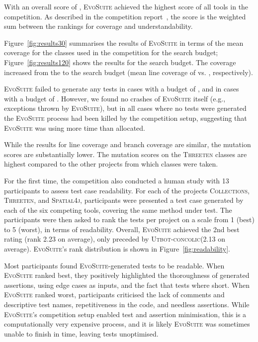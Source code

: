\documentclass[10pt,conference]{IEEEtran}
\newcommand{\project}[1]{\textsc{#1}\xspace}
\newcommand{\Collections}{\project{Collections}}
\newcommand{\Threeten}{\project{Threeten}}
\newcommand{\Spatial}{\project{Spatial4j}}
\newcommand{\EVOSUITE}{\textsc{EvoSuite}\xspace}
\newcommand{\UtbotConcolic}{\textsc{Utbot-concolic}\xspace}
\begin{document}
With an overall score of \score, \EVOSUITE achieved the highest score of all
tools in the competition. As described in the competition
report~\cite{SBST-toolcomp22}, the score is the weighted sum between the
rankings for coverage and understandability.

Figure~\ref{fig:results30} summarises the results of \EVOSUITE in terms of the
mean coverage for the \cuts classes used in the competition for the \budgetShort search budget; Figure~\ref{fig:results120} shows the results for the \budgetLong search budget. The coverage
increased from the \budgetShort to the \budgetLong search budget (mean line
coverage of \avgLinesCoverageRatioShort vs. \avgLinesCoverageRatioLong, respectively).

\EVOSUITE failed to generate any tests in \numTestGenFailedShort cases with a
budget of \budgetShort, and in \numTestGenFailedLong cases with a budget of
\budgetLong. However, we found no crashes of \EVOSUITE itself (e.g., exceptions
thrown by \EVOSUITE), but in all cases where no tests were generated the
\EVOSUITE process had been killed by the competition setup, suggesting that
\EVOSUITE was using more time than allocated.

While the results for line coverage and branch coverage are similar, the
mutation scores are substantially lower. The mutation scores on the \Threeten
classes are highest compared to the other projects from which classes were taken.

For the first time, the competition also conducted a human study with 13
participants to assess test case readability. For each of the projects \Collections,
\Threeten, and \Spatial, participants were presented a test case
generated by each of the six competing tools, covering the same method under
test. The participants were then asked to rank the tests per project
on a scale from 1 (best) to 5 (worst), in terms of readability. Overall,
\EVOSUITE achieved the 2nd best rating (rank 2.23 on average), only
preceded by \UtbotConcolic (2.13 on average). \EVOSUITE's rank distribution
is shown in Figure~\ref{fig:readability}.

Most participants found \EVOSUITE-generated tests to be readable. When
\EVOSUITE ranked best, they positively highlighted the thoroughness of
generated assertions, using edge cases as inputs, and the fact that tests
where short. When \EVOSUITE ranked worst, participants criticised the lack
of comments and descriptive test names, repetitiveness in the code, and
needless assertions. While \EVOSUITE's competition setup enabled test and
assertion minimisation, this is a computationally very expensive process,
and it is likely \EVOSUITE was sometimes unable to finish in time,
leaving tests unoptimised.
\end{document}
